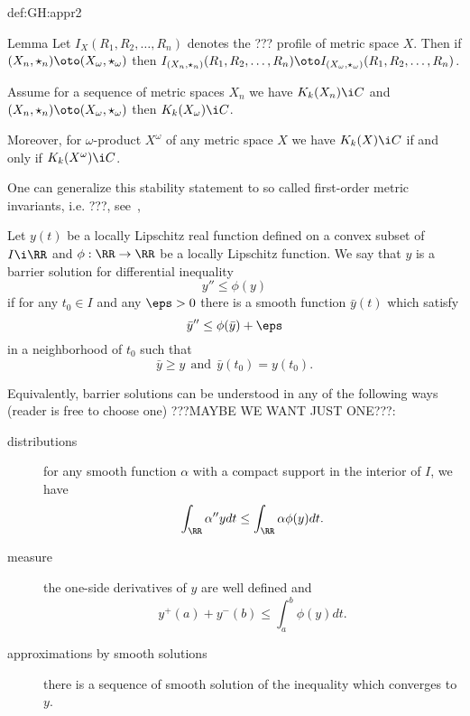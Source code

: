 {\begin{subthm}{def:GH:appr2}
\begin{thm}{Lemma}\label{lem:omega-stable}
Let $I_X(R_1,R_2,\dots,R_n)$ denotes the ??? profile of metric space $X$.
Then if $(X_n,\star_n)\oto (X_\omega,\star_\omega)$ then $I_{(X_n,\star_n)}(R_1,R_2,\dots,R_n)\oto I_{(X_\omega,\star_\omega)}(R_1,R_2,\dots,R_n)$.

Assume for a sequence of metric spaces $X_n$ we have $K_k(X_n)\i C$ and $(X_n,\star_n)\oto (X_\omega,\star_\omega)$ then $K_k(X_\omega)\i C$.

Moreover, for $\omega$-product $X^\omega$ of any metric space $X$ we have $K_k(X)\i C$ if and only if $K_k(X^\omega)\i C$.
\end{thm}
\qeds

 One can generalize this stability statement to so called first-order metric invariants, i.e. ???,  see~\cite[3.D$_+$]{gromov-MS}, 















Let $y(t)$ be a locally Lipschitz real function defined on a convex subset of $I\i\RR$ and $\phi:\RR\to\RR$ be a locally Lipschitz function.
We say that $y$ is a barrier solution for differential inequality 
$$y''\le\phi(y)$$
if for any $t_0\in I$ and any $\eps>0$ there is a smooth function $\bar y(t)$ which satisfy
$$\bar y''\le\phi(\bar y)+\eps$$
in a neighborhood of $t_0$ 
such that
$$\bar y\ge y\ \ \text{and}\ \ \bar y(t_0)= y(t_0).$$



Equivalently, barrier solutions can be understood in any of the following ways (reader is free to choose one) ???MAYBE WE WANT JUST ONE???:
\begin{description}
\item[distributions] for any smooth function $\alpha$ with a compact support in the interior of $I$, we have
$$\int_\RR \alpha''y d t\le \int_\RR\alpha\phi(y) d t.$$
\item[measure] the one-side derivatives of $y$ are well defined and
$$y^+(a)+y^-(b)\le \int_a^b \phi(y)d t.$$
\item[approximations by smooth solutions] there is a sequence of smooth solution of the inequality which converges to $y$. 
\end{description}













\end{subthm}}
